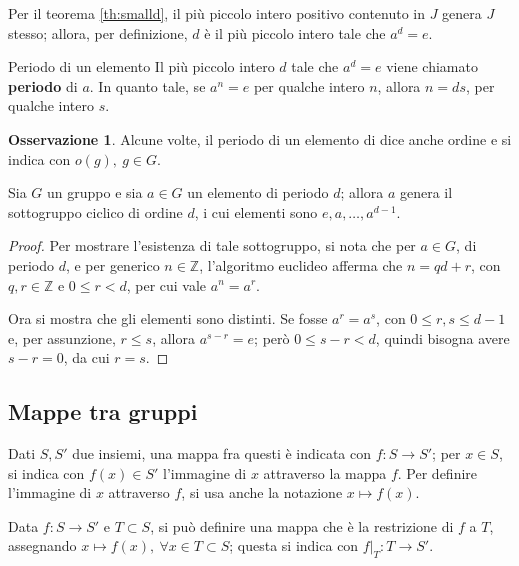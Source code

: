 \documentclass[11pt, a4paper]{scrartcl}
\theoremstyle{definition}
\numberwithin{esempio}{section}
\theoremstyle{definition}
\newtheorem{obs}{Osservazione}
\numberwithin{obs}{section}
\numberwithin{nota}{section}
\numberwithin{equation}{subsection}
\begin{document}
Per il teorema \ref{th:smalld}, il pi\`u piccolo intero positivo contenuto in $J$ genera $J$ stesso;
allora, per definizione, $d$ \`e il pi\`u piccolo intero tale che $a^d = e$. 
\begin{definizione}
	{Periodo di un elemento}{}
Il pi\`u piccolo intero $d$ tale che $a^d = e$ viene chiamato \textbf{periodo} di $a$. 
In quanto tale, se $a^n = e$ per qualche intero $n$, allora $n = ds$, per qualche intero $s$.
\end{definizione}
\begin{obs}
Alcune volte, il periodo di un elemento di dice anche ordine e si indica con $o(g), \ g \in G$.
\end{obs}
\begin{teorema}
	{}{}
	Sia $G$ un gruppo e sia $a \in G$ un elemento di periodo $d$; allora $a$ genera il sottogruppo ciclico di ordine $d$, i cui elementi sono $e, a , \ldots, a^{d-1} $.
	\begin{proof}
	Per mostrare l'esistenza di tale sottogruppo, si nota che per $a \in G$, di periodo $d$, e per generico $n \in \mathbb{Z}$, l'algoritmo euclideo afferma che $n = qd +r $, con $q,r \in \mathbb{Z}$ e $0\le r < d$, per cui vale $a^n = a^r$.

	Ora si mostra che gli elementi sono distinti.
	Se fosse $a^r = a^s$, con $0\le r ,s\le d-1$ e, per assunzione, $r\le s$, allora $a^{s-r} = e $; per\`o $0\le  s-r < d$, quindi bisogna avere $s-r=0$, da cui $r=s$.
	\end{proof}
\end{teorema}
\subsection{Mappe tra gruppi}
Dati $S , S' $ due insiemi, una mappa fra questi \`e indicata con $f: S \to S'$; per $x \in S$, si indica con $f(x) \in S'$ l'immagine di $x$ attraverso la mappa $f$.
Per definire l'immagine di $x$ attraverso $f$, si usa anche la notazione $x \mapsto f(x)$.

Data $f:S \to S'$ e $T \subset S$, si pu\`o definire una mappa che \`e la restrizione di $f$ a $T$, assegnando $x \mapsto f(x), \ \forall x \in T \subset S$; questa si indica con $f|_T : T \to S'$.
\end{document}
